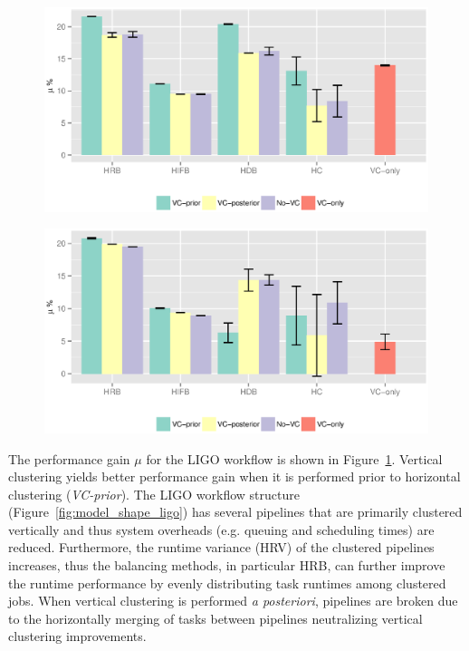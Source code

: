 \begin{figure}[!htb]
	\centering
	\includegraphics[width=0.8\linewidth]{figures/balance/figure26.eps}
	\label{fig:evaluation_vc_ligo}
\end{figure}


\begin{figure}[!htb]
	\centering
	\includegraphics[width=0.8\linewidth]{figures/balance/figure27.eps}
	\label{fig:evaluation_vc_genome}
\end{figure}

The performance gain $\mu$ for the LIGO workflow is shown in Figure~\ref{fig:evaluation_vc_ligo}. Vertical clustering yields better performance gain when it is performed prior to horizontal clustering (\emph{VC-prior}). The LIGO workflow structure (Figure~\ref{fig:model_shape_ligo}) has several pipelines that are primarily clustered vertically and thus system overheads (e.g. queuing and scheduling times) are reduced. Furthermore, the runtime variance (HRV) of the clustered pipelines increases, thus the balancing methods, in particular HRB, can further improve the runtime performance by evenly distributing task runtimes among clustered jobs. When vertical clustering is performed \emph{a posteriori}, pipelines are broken due to the horizontally merging of tasks between pipelines neutralizing vertical clustering improvements.





